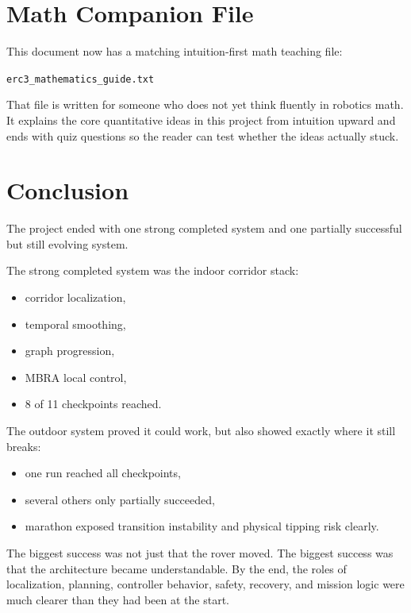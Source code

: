 \documentclass[11pt]{article}
\begin{document}
\section{Math Companion File}

This document now has a matching intuition-first math teaching file:

\begin{center}
\texttt{erc3\_mathematics\_guide.txt}
\end{center}

That file is written for someone who does not yet think fluently in robotics math.
It explains the core quantitative ideas in this project from intuition upward and
ends with quiz questions so the reader can test whether the ideas actually stuck.

\section{Conclusion}

The project ended with one strong completed system and one partially successful but
still evolving system.

The strong completed system was the indoor corridor stack:

\begin{itemize}[nosep]
  \item corridor localization,
  \item temporal smoothing,
  \item graph progression,
  \item MBRA local control,
  \item 8 of 11 checkpoints reached.
\end{itemize}

The outdoor system proved it could work, but also showed exactly where it still
breaks:

\begin{itemize}[nosep]
  \item one run reached all checkpoints,
  \item several others only partially succeeded,
  \item marathon exposed transition instability and physical tipping risk clearly.
\end{itemize}

The biggest success was not just that the rover moved. The biggest success was that
the architecture became understandable. By the end, the roles of localization,
planning, controller behavior, safety, recovery, and mission logic were much
clearer than they had been at the start.
\end{document}
